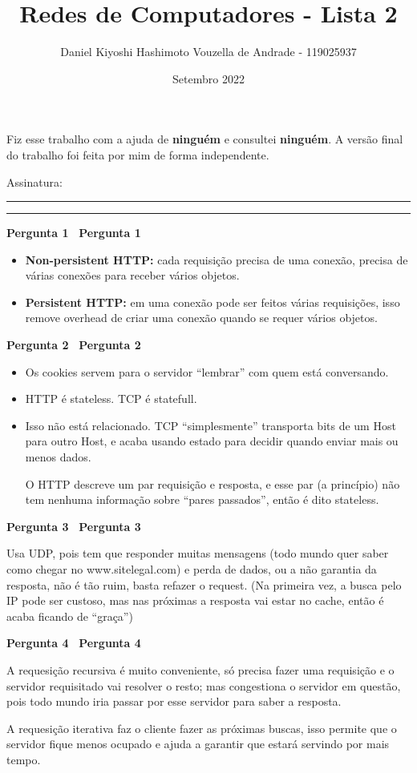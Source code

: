 \documentclass{article}
\title{Redes de Computadores - Lista 2}
\author{Daniel Kiyoshi Hashimoto Vouzella de Andrade - 119025937}
\date{Setembro 2022}
\newcommand{\blank}{\rule[0pt]{5em}{.3pt}}
\newcommand{\nobody}{ninguém}
\newcommand{\preamble}[2]{\noindent%
    Fiz esse trabalho com a ajuda de {\bfseries #1}
    e consultei {\bfseries #2}.
    A versão final do trabalho foi feita
    por mim de forma independente.
    \par\noindent Assinatura: \blank\blank\bigskip}
\newcounter{exe-list}
\newenvironment{exe}[2][Problema]
    {\newcommand{\opt}{(Opcional)}%
    \newcommand{\sketch}[1]{{\bfseries Rascunho:} ##1}%
    \medskip\par\noindent\ifthenelse{\equal{#1}{}}
        {\textbf{\large #2}}
        {\textbf{\large #1~#2}}%
    \medskip\par\noindent}
    {\medskip}
\begin{document}
\maketitle

\preamble{\nobody}{\nobody}

\begin{exe}[]{Pergunta 1}
    \begin{itemize}
        \item \textbf{Non-persistent HTTP:}
            cada requisição precisa de uma conexão,
            precisa de várias conexões para receber vários objetos.
        \item \textbf{Persistent HTTP:}
            em uma conexão pode ser feitos várias requisições,
            isso remove overhead de criar uma conexão
            quando se requer vários objetos.
    \end{itemize}
\end{exe}

\begin{exe}[]{Pergunta 2}
    \begin{itemize}
        \item Os cookies servem para o servidor ``lembrar''
            com quem está conversando.
        \item HTTP é stateless. TCP é statefull.
        \item Isso não está relacionado.
            TCP ``simplesmente'' transporta bits de
            um Host para outro Host,
            e acaba usando estado para decidir
            quando enviar mais ou menos dados.

            O HTTP descreve um par requisição e resposta,
            e esse par (a princípio) não tem nenhuma informação sobre
            ``pares passados'', então é dito stateless.
    \end{itemize}
\end{exe}

\begin{exe}[]{Pergunta 3}
    Usa UDP,
    pois tem que responder muitas mensagens
    (todo mundo quer saber como chegar no www.sitelegal.com)
    e perda de dados, ou a não garantia da resposta,
    não é tão ruim, basta refazer o request.
    (Na primeira vez, a busca pelo IP pode ser custoso,
    mas nas próximas a resposta vai estar no cache,
    então é acaba ficando de ``graça'')
\end{exe}

\begin{exe}[]{Pergunta 4}
    A requesição recursiva é muito conveniente,
    só precisa fazer uma requisição e
    o servidor requisitado vai resolver o resto;
    mas congestiona o servidor em questão,
    pois todo mundo iria passar por esse servidor
    para saber a resposta.

    A requesição iterativa faz o cliente fazer as próximas buscas,
    isso permite que o servidor fique menos ocupado
    e ajuda a garantir que estará servindo por mais tempo.
\end{exe}
\end{document}
